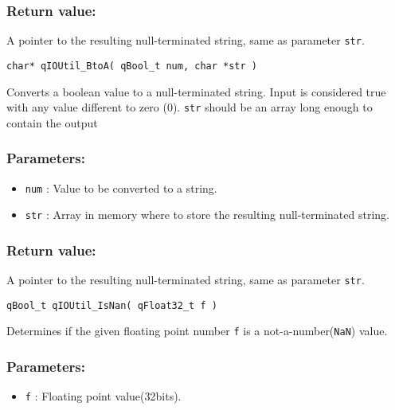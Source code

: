 \subsubsection*{Return value:}
A pointer to the resulting null-terminated string, same as parameter \lstinline{str}.


\noindent\hrulefill

\begin{lstlisting}[style=CStyle]
char* qIOUtil_BtoA( qBool_t num, char *str )
\end{lstlisting}

Converts a boolean value to a null-terminated string. Input is considered true
with any value different to zero (0). 
\lstinline{str} should be an array long enough to contain the output

\subsubsection*{Parameters:}
\begin{itemize}
    \item \lstinline{num} : Value to be converted to a string.
    \item \lstinline{str} : Array in memory where to store the resulting null-terminated string.
\end{itemize}

\subsubsection*{Return value:}
A pointer to the resulting null-terminated string, same as parameter \lstinline{str}.



\noindent\hrulefill

\begin{lstlisting}[style=CStyle]
qBool_t qIOUtil_IsNan( qFloat32_t f )
\end{lstlisting}

Determines if the given floating point number \lstinline{f} is a not-a-number(\lstinline{NaN}) value. 

\subsubsection*{Parameters:}
\begin{itemize}
    \item \lstinline{f} : Floating point value(32bits).
\end{itemize}

